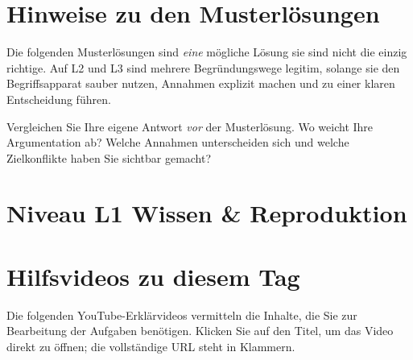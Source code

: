 \documentclass[11pt,a4paper,oneside]{article}
\begin{document}
\section*{Hinweise zu den Musterlösungen}
\thispagestyle{plain}

\noindent Die folgenden Musterlösungen sind \emph{eine} mögliche Lösung \textendash{} sie sind nicht die einzig richtige. Auf L2 und L3 sind mehrere Begründungswege legitim, solange sie den Begriffsapparat sauber nutzen, Annahmen explizit machen und zu einer klaren Entscheidung führen.

\begin{infobox}
Vergleichen Sie Ihre eigene Antwort \emph{vor} der Musterlösung. Wo weicht Ihre Argumentation ab? Welche Annahmen unterscheiden sich \textendash{} und welche Zielkonflikte haben Sie sichtbar gemacht?
\end{infobox}

\clearpage

\section*{Niveau L1 \textendash{} Wissen \& Reproduktion}

\section*{Hilfsvideos zu diesem Tag}
\thispagestyle{plain}

\noindent Die folgenden YouTube-Erkl\"arvideos vermitteln die Inhalte, die Sie zur Bearbeitung der Aufgaben ben\"otigen. Klicken Sie auf den Titel, um das Video direkt zu \"offnen; die vollst\"andige URL steht in Klammern.
\end{document}
